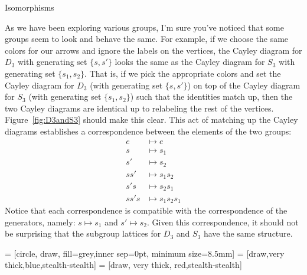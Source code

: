\begin{section}{Isomorphisms}\label{sec:isomorphisms}


As we have been exploring various groups, I'm sure you've noticed that some groups seem to look and behave the same.  For example, if we choose the same colors for our arrows and ignore the labels on the vertices, the Cayley diagram for $D_3$ with generating set $\{s,s'\}$ looks the same as the Cayley diagram for $S_3$ with generating set $\{s_1, s_2\}$. That is, if we pick the appropriate colors and set the Cayley diagram for $D_3$ (with generating set $\{s,s'\}$) on top of the Cayley diagram for $S_3$ (with generating set $\{s_1, s_2\}$) such that the identities match up, then the two Cayley diagrams are identical up to relabeling the rest of the vertices.  Figure~\ref{fig:D3andS3} should make this clear.  This act of matching up the Cayley diagrams establishes a correspondence between the elements of the two groups:
\begin{align*}
e & \mapsto e\\
s & \mapsto s_1\\
s' &\mapsto s_2\\
ss' &\mapsto s_1s_2\\
s's & \mapsto s_2s_1\\
ss's & \mapsto s_1s_2s_1
\end{align*}
Notice that each correspondence is compatible with the correspondence of the generators, namely: $s \mapsto s_1$ and $s' \mapsto s_2$. Given this correspondence, it should not be surprising that the subgroup lattices for $D_3$ and $S_3$ have the same structure.

 = [circle, draw, fill=grey,inner sep=0pt, minimum size=8.5mm]
 = [draw,very thick,blue,stealth-stealth]
 = [draw, very thick, red,stealth-stealth]


\end{section}
